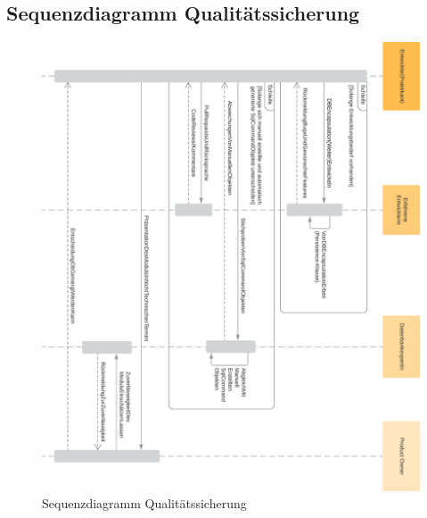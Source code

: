 \documentclass[11pt,toc=sectionentrywithoutdots, 
headheight=44pt, headings=optiontoheadandtoc, hyperfootnotes=false, hypertexnames=false]{scrartcl}
\begin{document}
 
\subsection{Sequenzdiagramm Qualitätssicherung}
 \label{fig:Sequenzdiagramm Entwicklung und Tests}

 \begin{figure}[H]
 \centering
	\includegraphics[scale=0.85]{Einfaches Sequenzdiagramm_2.png}
	 \caption{Sequenzdiagramm Qualitätssicherung}
\end{figure}%
\end{document}
